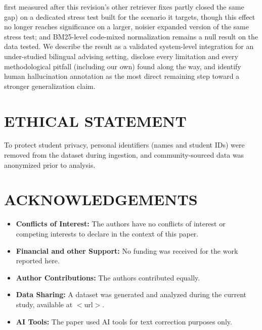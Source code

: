 \documentclass[a4paper,twoside]{article}
\begin{document}
first measured after this revision's other retriever fixes partly closed the same gap) on a dedicated stress test built for the scenario it targets, though this effect no longer reaches significance on a larger, noisier expanded version of the same stress test; and BM25-level code-mixed normalization remains a null result on the data tested. We describe the result as a validated system-level integration for an under-studied bilingual advising setting, disclose every limitation and every methodological pitfall (including our own) found along the way, and identify human hallucination annotation as the most direct remaining step toward a stronger generalization claim.

\section*{\uppercase{Ethical Statement}}

To protect student privacy, personal identifiers (names and student IDs) were removed from the dataset during ingestion, and community-sourced data was anonymized prior to analysis.

\section*{\uppercase{Acknowledgements}}

\begin{itemize}
  \item \textbf{Conflicts of Interest:} The authors have no conflicts of interest or competing interests to declare in the context of this paper.
  \item \textbf{Financial and other Support:} No funding was received for the work reported here.
  \item \textbf{Author Contributions:} The authors contributed equally.
  \item \textbf{Data Sharing:} A dataset was generated and analyzed during the current study, available at $<$url$>$.
  \item \textbf{AI Tools:} The paper used AI tools for text correction purposes only.
\end{itemize}
\end{document}
